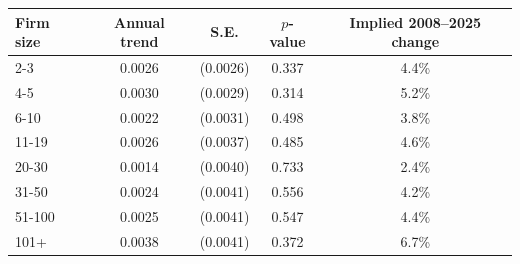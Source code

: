 \begin{tabular}{lcccc}
\toprule
    Firm size & Annual trend & S.E. & $p$-value & Implied 2008--2025 change \\
    \midrule
2-3 & 0.0026 & (0.0026) & 0.337 & 4.4\% \\
4-5 & 0.0030 & (0.0029) & 0.314 & 5.2\% \\
6-10 & 0.0022 & (0.0031) & 0.498 & 3.8\% \\
11-19 & 0.0026 & (0.0037) & 0.485 & 4.6\% \\
20-30 & 0.0014 & (0.0040) & 0.733 & 2.4\% \\
31-50 & 0.0024 & (0.0041) & 0.556 & 4.2\% \\
51-100 & 0.0025 & (0.0041) & 0.547 & 4.4\% \\
101+ & 0.0038 & (0.0041) & 0.372 & 6.7\%\\
\bottomrule\end{tabular}
